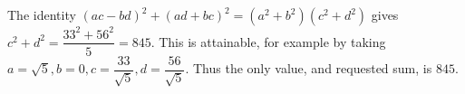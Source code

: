 The identity $(ac-bd)^2+(ad+bc)^2=(a^2+b^2)(c^2+d^2)$ gives $c^2+d^2=\dfrac{33^2+56^2}{5}=845$. This is attainable, for example by taking $a=\sqrt5,b=0,c=\dfrac{33}{\sqrt5},d=\dfrac{56}{\sqrt5}$. Thus the only value, and requested sum, is $\boxed{845}$.
